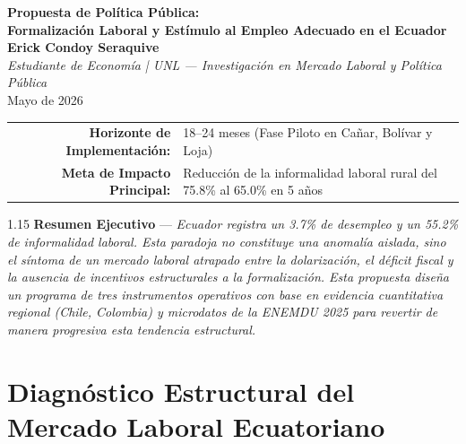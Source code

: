 \documentclass[10pt,]{article}
\begin{document}
\begin{center}
\sffamily
{\color{primary}\Huge\bfseries Propuesta de Política Pública: \\ Formalización Laboral y Estímulo al Empleo Adecuado en el Ecuador} \\
\vspace{1.5em}
{\color{darkgray}\large\bfseries Erick Condoy Seraquive} \\
\textit{Estudiante de Economía | UNL --- Investigación en Mercado Laboral y Política Pública} \\
\vspace{0.8em}
\sffamily\small Mayo de 2026
\end{center}

\begin{center}
\sffamily\small
\begin{tabular}{rl}
\textbf{Horizonte de Implementación:} & 18--24 meses (Fase Piloto en Cañar, Bolívar y Loja) \\
\textbf{Meta de Impacto Principal:} & Reducción de la informalidad laboral rural del 75.8\% al 65.0\% en 5 años \\
\end{tabular}
\end{center}
\vspace{1.2em}

\begin{center}
\begin{minipage}{0.9\textwidth}
\begin{spacing}{1.15}
\sffamily\small
\color{primary}
\textbf{Resumen Ejecutivo} ---
\textit{Ecuador registra un 3.7\% de desempleo y un 55.2\% de informalidad laboral. Esta paradoja no constituye una anomalía aislada, sino el síntoma de un mercado laboral atrapado entre la dolarización, el déficit fiscal y la ausencia de incentivos estructurales a la formalización. Esta propuesta diseña un programa de tres instrumentos operativos con base en evidencia cuantitativa regional (Chile, Colombia) y microdatos de la ENEMDU 2025 para revertir de manera progresiva esta tendencia estructural.}
\end{spacing}
\end{minipage}
\end{center}
\vspace{1.5em}

\section{Diagnóstico Estructural del Mercado Laboral
Ecuatoriano}\label{diagnuxf3stico-estructural-del-mercado-laboral-ecuatoriano}
\end{document}
